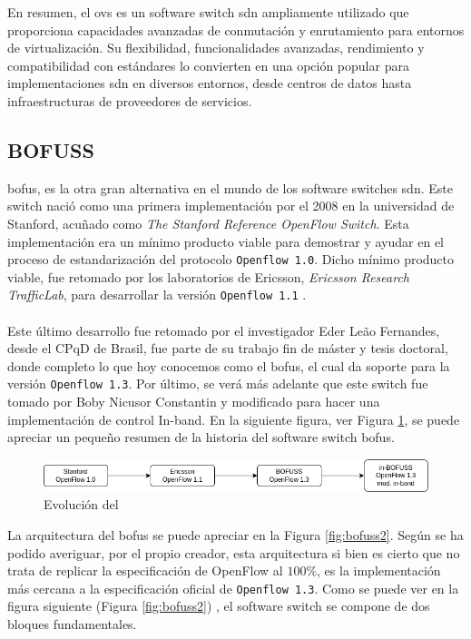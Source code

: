 En resumen, el \gls{ovs} es un software switch \gls{sdn} ampliamente utilizado que proporciona capacidades avanzadas de conmutación y enrutamiento para entornos de virtualización. Su flexibilidad, funcionalidades avanzadas, rendimiento y compatibilidad con estándares lo convierten en una opción popular para implementaciones \gls{sdn} en diversos entornos, desde centros de datos hasta infraestructuras de proveedores de servicios.


\subsection{BOFUSS}
\label{subsec:BOFUSS}

\gls{bofus}, es la otra gran alternativa en el mundo de los software switches \gls{sdn}. Este switch nació como una primera implementación por el 2008 en la universidad de Stanford, acuñado como  \textit{The Stanford Reference OpenFlow Switch}. Esta implementación era un mínimo producto viable para demostrar y ayudar en el proceso de estandarización del protocolo \texttt{Openflow 1.0}. Dicho mínimo producto viable, fue retomado por los laboratorios de Ericsson, \textit{Ericsson Research TrafficLab}, para desarrollar la versión \texttt{Openflow 1.1} \cite{fernandes2020road}. \\
\\
Este último desarrollo fue retomado por el investigador Eder Leão Fernandes, desde el CPqD de Brasil, fue parte de su trabajo fin de máster y tesis doctoral, donde completo lo que hoy conocemos como el \gls{bofus}, el cual da soporte para la versión \texttt{Openflow 1.3}. Por último, se verá más adelante que este switch fue tomado por Boby Nicusor Constantin y modificado para hacer una implementación de control In-band. En la siguiente figura, ver Figura \ref{fig:bofuss1}, se puede apreciar un pequeño resumen de la historia del software switch \gls{bofus}.

\begin{figure}[ht]
    \centering
    \includegraphics[width=\textwidth]{archivos/img/teoria/bofuss1.png}
    \caption{Evolución del }
    \label{fig:bofuss1}
\end{figure}

La arquitectura del \gls{bofus} se puede apreciar en la Figura \ref{fig:bofuss2}. Según se ha podido averiguar, por el propio creador, esta arquitectura si bien es cierto que no trata de replicar la especificación de OpenFlow al $100\%$, es la implementación más cercana a la especificación oficial de \texttt{Openflow 1.3}. Como se puede ver en la figura siguiente (Figura \ref{fig:bofuss2}) , el software switch se compone de dos bloques fundamentales.

